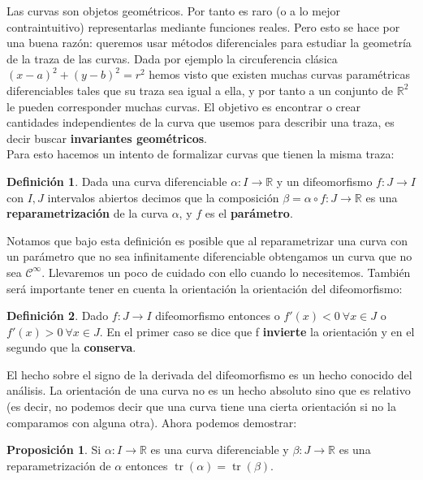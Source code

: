 \documentclass{article}
\theoremstyle{definition}
\newtheorem{prop}{Proposición}
\newtheorem{define}{Definición}
\DeclareMathOperator{\trace}{tr}
\newcommand{\reales}{\mathbb{R}}
\newcommand{\cinfinito}{\mathcal{C}^{\infty}}
\begin{document}
Las curvas son objetos geométricos. Por tanto es raro (o a lo mejor contraintuitivo) representarlas mediante funciones reales. Pero esto se hace por una buena razón: queremos usar métodos diferenciales para estudiar la geometría de la traza de las curvas. Dada por ejemplo la circuferencia clásica $(x-a)^2 + (y-b)^2 = r^2$ hemos visto que existen muchas curvas paramétricas diferenciables tales que su traza sea igual a ella, y por tanto a un conjunto de $\reales^2$ le pueden corresponder muchas curvas. El objetivo es encontrar o crear cantidades independientes de la curva que usemos para describir una traza, es decir buscar \textbf{invariantes geométricos}.\\ 
Para esto hacemos un intento de formalizar curvas que tienen la misma traza:

\begin{define}
	Dada una curva diferenciable $\alpha: I \rightarrow \reales$ y un difeomorfismo $f: J \rightarrow I$ con $I,J$ intervalos abiertos decimos que la composición $\beta = \alpha \circ f : J \rightarrow \reales$ es una \textbf{reparametrización} de la curva $\alpha$, y $f$ es el \textbf{parámetro}.
\end{define}

Notamos que bajo esta definición es posible que al reparametrizar una curva con un parámetro que no sea infinitamente diferenciable obtengamos un curva que no sea $\cinfinito$. Llevaremos un poco de cuidado con ello cuando lo necesitemos. También será importante tener en cuenta la orientación la orientación del difeomorfismo:

\begin{define}
	Dado $f: J \rightarrow I$ difeomorfismo entonces o $f'(x) < 0\ \forall x \in J$ o $f'(x) > 0\ \forall x \in J$. En el primer caso se dice que f \textbf{invierte} la orientación y en el segundo que la \textbf{conserva}.
\end{define}

El hecho sobre el signo de la derivada del difeomorfismo es un hecho conocido del análisis. La orientación de una curva no es un hecho absoluto sino que es relativo (es decir, no podemos decir que una curva tiene una cierta orientación si no la comparamos con alguna otra). Ahora podemos demostrar:

\begin{prop}\label{prop_curvas_traza}
	Si $\alpha: I \rightarrow \reales$ es una curva diferenciable y $\beta: J \rightarrow \reales$ es una reparametrización de $\alpha$ entonces $\trace (\alpha) = \trace (\beta)$.
\end{prop}
\end{document}
